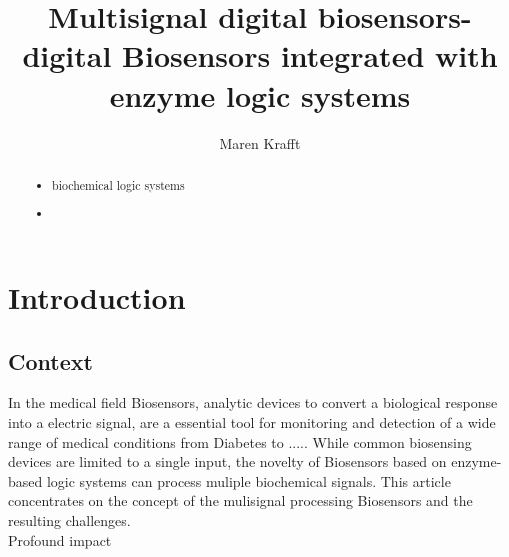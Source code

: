 \documentclass[runningheads]{llncs}
\begin{document}
\title{Multisignal digital biosensors- digital Biosensors integrated with enzyme logic systems}
\author{Maren Krafft}
\maketitle        

      
\begin{abstract}
	

\begin{itemize}
	\item biochemical logic systems
	\item 
\end{itemize}



\end{abstract}

\section{Introduction}

\subsection{Context}

	In the medical field Biosensors, analytic devices to convert a biological response into a electric signal, are a essential tool for monitoring and detection of a wide range of medical conditions from Diabetes to .....
	While common biosensing devices are limited to a single input, the novelty of Biosensors based on enzyme-based logic systems can process muliple biochemical signals. This article concentrates on the concept of the mulisignal processing Biosensors and the resulting challenges.\\
	
	Profound impact\\
	
\end{document}

